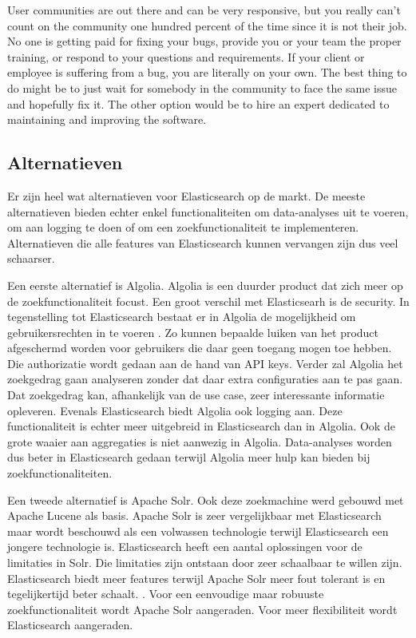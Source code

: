 User communities are out there and can be very responsive, but you really can’t count on the community one hundred percent of the time since it is not their job. No one is getting paid for fixing your bugs, provide you or your team the proper training, or respond to your questions and requirements. If your client or employee is suffering from a bug, you are literally on your own. The best thing to do might be to just wait for somebody in the community to face the same issue and hopefully fix it. The other option would be to hire an expert dedicated to maintaining and improving the software.

\subsection{Alternatieven}

Er zijn heel wat alternatieven voor Elasticsearch op de markt. De meeste alternatieven bieden echter enkel functionaliteiten om data-analyses uit te voeren, om aan logging te doen of om een zoekfunctionaliteit te implementeren. Alternatieven die alle features van Elasticsearch kunnen vervangen zijn dus veel schaarser. 

Een eerste alternatief is Algolia. Algolia is een duurder product dat zich meer op de zoekfunctionaliteit focust. Een groot verschil met Elasticsearh is de security. In tegenstelling tot Elasticsearch bestaat er in Algolia de mogelijkheid om gebruikersrechten in te voeren \autocite{Algolia}. Zo kunnen bepaalde luiken van het product afgeschermd worden voor gebruikers die daar geen toegang mogen toe hebben. Die authorizatie wordt gedaan aan de hand van API keys. Verder zal Algolia het zoekgedrag gaan analyseren zonder dat daar extra configuraties aan te pas gaan. Dat zoekgedrag kan, afhankelijk van de use case, zeer interessante informatie opleveren. Evenals Elasticsearch biedt Algolia ook logging aan. Deze functionaliteit is echter meer uitgebreid in Elasticsearch dan in Algolia. Ook de grote waaier aan aggregaties is niet aanwezig in Algolia. Data-analyses worden dus beter in Elasticsearch gedaan terwijl Algolia meer hulp kan bieden bij zoekfunctionaliteiten.

Een tweede alternatief is Apache Solr. Ook deze zoekmachine werd gebouwd met Apache Lucene als basis. Apache Solr is zeer vergelijkbaar met Elasticsearch maar wordt beschouwd als een volwassen technologie terwijl Elasticsearch een jongere technologie is. Elasticsearch heeft een aantal oplossingen voor de limitaties in Solr. Die limitaties zijn ontstaan door zeer schaalbaar te willen zijn. Elasticsearch biedt meer features terwijl Apache Solr meer fout tolerant is en tegelijkertijd beter schaalt. \autocite{Solr}. Voor een eenvoudige maar robuuste zoekfunctionaliteit wordt Apache Solr aangeraden. Voor meer flexibiliteit wordt Elasticsearch aangeraden.

